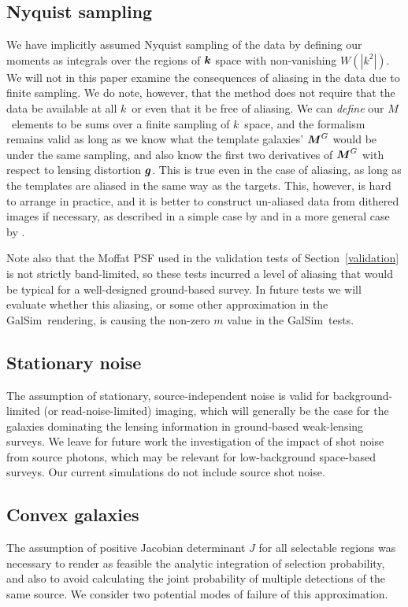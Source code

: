 \documentclass[11pt,preprint,flushrt]{aastex}
\newcommand{\vecg}{\mbox{\boldmath $g$}}
\newcommand{\vecM}{\mbox{\boldmath $M$}}
\newcommand{\veck}{\mbox{\boldmath $k$}}
\newcommand{\galsim}{{\sc GalSim}}
\newcommand\edit[1]{#1}
\begin{document}
\subsection{Nyquist sampling}
\label{nyquistsec}
We have implicitly assumed Nyquist sampling of the data by defining
our moments as integrals over the regions of $\veck$ space with
non-vanishing $W(|k^2|).$  We will not in this paper examine the
consequences of aliasing in the data due to finite sampling.  We do
note, however, that the method does not require that the data be
available at all \veck\ or even that it be free of aliasing.  We can
\emph{define} our \vecM\ elements to be sums over a finite sampling of \veck\
space, and the formalism remains valid as long as we know what the
template galaxies' $\vecM^G$ would be under the same sampling, and
also know the first two derivatives of $\vecM^G$ with respect to
lensing distortion $\vecg$.  This is true even in the case of
aliasing, as long as the templates are aliased in the same way as the
targets.  This, however, is hard to arrange in practice, and it is
better to construct un-aliased data from dithered images if necessary,
as described in a simple case by \citet{Lauer} and in a more general
case by \citet{imcom}.  

Note also that the Moffat PSF used in the
validation tests of Section~\ref{validation} is not strictly
band-limited, so these tests incurred a level of aliasing that would
be typical for a well-designed ground-based survey.  \edit{In future tests
we will evaluate whether this aliasing, or some other approximation in
the \galsim\ rendering, is causing the non-zero $m$ value in the
\galsim\ tests.}

\subsection{Stationary noise}
The assumption of stationary, source-independent noise is valid for
background-limited (or read-noise-limited) imaging, which will
generally be the case for the galaxies dominating the lensing
information in ground-based weak-lensing surveys.  
We leave for future work the investigation of the impact of shot noise
from source photons, which may be relevant for low-background space-based surveys.
\edit{Our current simulations do not include source shot noise.}

\subsection{Convex galaxies}
\label{convexsec}
The assumption of positive Jacobian determinant $J$ for all
selectable regions was necessary to render as feasible the analytic
integration of selection probability, and also to avoid calculating
the joint probability of multiple detections of the same source.  
We consider two potential modes of failure of this approximation.
\end{document}
